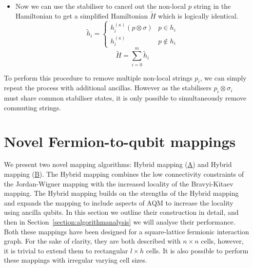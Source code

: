 \documentclass[pdftex,pra,aps,twocolumn,twoside]{revtex4-2}
\theoremstyle{plain}
\theoremstyle{note}
\newcommand\+{{\footnotesize \raisebox{0.3ex}{+}}}
\begin{document}
\begin{itemize}
\begin{equation}
    \label{eq:equivalent_to_original_hamiltonian}
    H^{(\kappa)}\ket{\tilde \psi}_{SA} = V (H \otimes I) \ket{\psi}_S \ket{0}_A
\end{equation}
\item Now we can use the stabiliser to cancel out the non-local $p$ string in the Hamiltonian to get a simplified Hamiltonian $\tilde H$ which is logically identical.
\begin{equation}
   \tilde h_i = \begin{cases} h_i^{(\kappa)} (p \otimes \sigma)  &  p \in h_i \\ 
   h_i^{(\kappa)} & p \notin h_i \end{cases}
\end{equation}
\begin{equation}
    \tilde H = \sum_{i=0}^m \tilde h_i
\end{equation}
\end{itemize}
To perform this procedure to remove multiple non-local strings $p_i$, we can simply repeat the process with additional ancillas. However as the stabilisers $p_i \otimes \sigma_i$ must share common stabiliser states, it is only possible to simultaneously remove commuting strings. 

\section{Novel Fermion-to-qubit mappings}
We present two novel mapping algorithms: Hybrid mapping (\hyperref[section:Hybridmapping]{A}) and Hybrid\+ mapping (\hyperref[section:auxHybridmapping]{B}). The Hybrid mapping combines the low connectivity constraints of the Jordan-Wigner mapping with the increased locality of the Bravyi-Kitaev mapping. The Hybrid\+ mapping builds on the strengths of the Hybrid mapping and expands the mapping to include aspects of AQM \cite{steudtner2019quantum} to increase the locality using ancilla qubits.
In this section we outline their construction in detail, and then in Section~\ref{section:algorithmanalysis} we will analyse their performance. 
Both these mappings have been designed for a square-lattice fermionic interaction graph. For the sake of clarity, they are both described with $n \times n$ cells, however, it is trivial to extend them to rectangular $l \times h$ cells. It is also possible to perform these mappings with irregular varying cell sizes.
\end{document}
